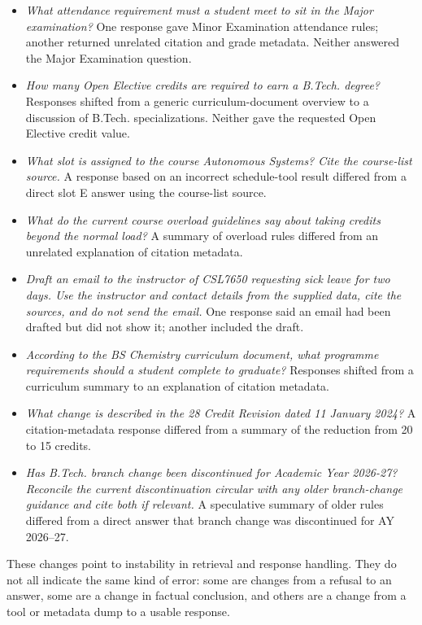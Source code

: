 \documentclass[11pt,a4paper]{article}
\begin{document}
\begin{itemize}
  \item \textit{What attendance requirement must a student meet to sit in the Major examination?} One response gave Minor Examination attendance rules; another returned unrelated citation and grade metadata. Neither answered the Major Examination question.
  \item \textit{How many Open Elective credits are required to earn a B.Tech. degree?} Responses shifted from a generic curriculum-document overview to a discussion of B.Tech. specializations. Neither gave the requested Open Elective credit value.
  \item \textit{What slot is assigned to the course Autonomous Systems? Cite the course-list source.} A response based on an incorrect schedule-tool result differed from a direct slot E answer using the course-list source.
  \item \textit{What do the current course overload guidelines say about taking credits beyond the normal load?} A summary of overload rules differed from an unrelated explanation of citation metadata.
  \item \textit{Draft an email to the instructor of CSL7650 requesting sick leave for two days. Use the instructor and contact details from the supplied data, cite the sources, and do not send the email.} One response said an email had been drafted but did not show it; another included the draft.
  \item \textit{According to the BS Chemistry curriculum document, what programme requirements should a student complete to graduate?} Responses shifted from a curriculum summary to an explanation of citation metadata.
  \item \textit{What change is described in the 28 Credit Revision dated 11 January 2024?} A citation-metadata response differed from a summary of the reduction from 20 to 15 credits.
  \item \textit{Has B.Tech. branch change been discontinued for Academic Year 2026-27? Reconcile the current discontinuation circular with any older branch-change guidance and cite both if relevant.} A speculative summary of older rules differed from a direct answer that branch change was discontinued for AY 2026--27.
\end{itemize}

These changes point to instability in retrieval and response handling. They do not all indicate the same kind of error: some are changes from a refusal to an answer, some are a change in factual conclusion, and others are a change from a tool or metadata dump to a usable response.
\end{document}
